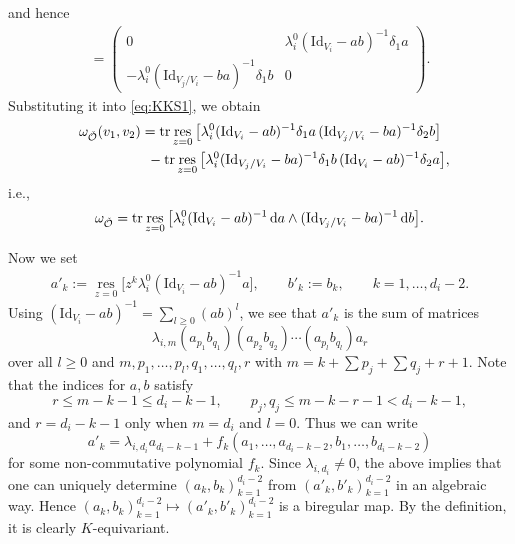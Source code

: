 \documentclass[pdftex]{sigma}
\numberwithin{equation}{section}
\theoremstyle{definition}
\newcommand{\tr}{\operatorname{tr}}
\newcommand{\unit}{\mathrm{Id}}
\newcommand{\res}{\operatorname*{res}}
\newcommand{\bO}{\mathcal{O}}
\newcommand{\rd}{\mathop{\mathrm{d}\!}\mathstrut}
\begin{document}
and hence
\begin{gather*}
[\Lambda^0, g^{-1}\delta_1 g] =
\begin{pmatrix}
0 & \lambda_i^0(\unit_{V_i}-ab)^{-1}\delta_1 a \\
-\lambda_i^0(\unit_{V_j/V_i}-ba)^{-1}\delta_1 b & 0
\end{pmatrix}.
\end{gather*}
Substituting it into \eqref{eq:KKS1},
we obtain
\begin{gather*}
\omega_{\check{\bO}} (v_1,v_2)
= \tr \res_{z=0} \big[ \lambda_i^0(\unit_{V_i}-ab)^{-1}\delta_1 a\,
(\unit_{V_j/V_i}-ba)^{-1}\delta_2 b \big] \\
\hphantom{\omega_{\check{\bO}} (v_1,v_2)=}{}  - \tr \res_{z=0} \big[
\lambda_i^0(\unit_{V_j/V_i}-ba)^{-1}\delta_1 b\,
(\unit_{V_i}-ab)^{-1}\delta_2 a \big],
\end{gather*}
i.e.,
\begin{gather}\label{eq:KKS2}
\omega_{\check{\bO}} = \tr \res_{z=0} \big[ \lambda_i^0(\unit_{V_i}-ab)^{-1}\rd a
\wedge (\unit_{V_j/V_i}-ba)^{-1}\rd b \big].
\end{gather}

Now we set
\begin{gather}\label{eq:basechange}
a'_k := \res_{z=0} \big[ z^k \lambda_i^0 (\unit_{V_i}-ab)^{-1}a \big],
\qquad b'_k := b_k,
\qquad  k=1,\dots ,d_i-2 .
\end{gather}
Using $(\unit_{V_i}-ab)^{-1} = \sum\limits_{l \geq 0} (ab)^l$,
we see that $a'_k$ is the sum of matrices
\[
\lambda_{i,m} (a_{p_1}b_{q_1})(a_{p_2}b_{q_2}) \cdots
(a_{p_l}b_{q_l}) a_r
\]
over all $l \geq 0$ and $m, p_1, \dots ,p_l, q_1, \dots ,q_l, r$
with $m = k+ \sum p_j + \sum q_j + r +1$.
Note that the indices for $a,b$ satisfy
\[
r \leq m - k -1 \leq d_i -k-1, \qquad
p_j, q_j \leq m-k-r-1 < d_i -k-1,
\]
and $r=d_i-k-1$ only when $m=d_i$ and $l=0$.
Thus we can write
\[
a'_k = \lambda_{i,d_i} a_{d_i -k-1} +
f_k(a_1,\dots ,a_{d_i-k-2},b_1,\dots ,b_{d_i-k-2})
\]
for some non-commutative polynomial $f_k$.
Since $\lambda_{i,d_i} \neq 0$,
the above implies that one can uniquely determine $(a_k,b_k)_{k=1}^{d_i-2}$
from $(a'_k,b'_k)_{k=1}^{d_i-2}$ in an algebraic way.
Hence $(a_k,b_k)_{k=1}^{d_i-2} \mapsto (a'_k,b'_k)_{k=1}^{d_i-2}$
is a biregular map.
By the def\/inition, it is clearly $K$-equivariant.
\end{document}
